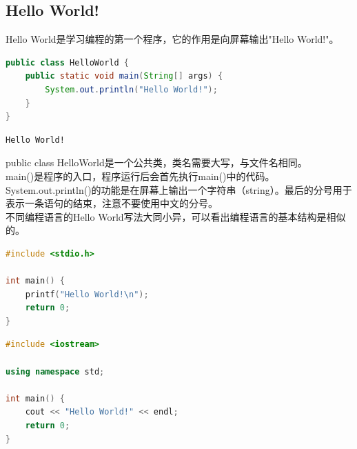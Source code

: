 \vspace{0.5cm}

\subsection{Hello World!}

Hello World是学习编程的第一个程序，它的作用是向屏幕输出"Hello World!"。\\


\begin{lstlisting}[language=Java]
public class HelloWorld {
	public static void main(String[] args) {
		System.out.println("Hello World!");
	}
}
\end{lstlisting}

\begin{tcolorbox}
	\begin{verbatim}
Hello World!
	\end{verbatim}
\end{tcolorbox}

public class HelloWorld是一个公共类，类名需要大写，与文件名相同。\\

main()是程序的入口，程序运行后会首先执行main()中的代码。System.out.println()的功能是在屏幕上输出一个字符串（string）。最后的分号用于表示一条语句的结束，注意不要使用中文的分号。\\

不同编程语言的Hello World写法大同小异，可以看出编程语言的基本结构是相似的。\\


\begin{lstlisting}[language=C]
#include <stdio.h>

int main() {
	printf("Hello World!\n");
	return 0;
}
\end{lstlisting}

\vspace{0.5cm}


\begin{lstlisting}[language=C++]
#include <iostream>

using namespace std;

int main() {
	cout << "Hello World!" << endl;
	return 0;
}
\end{lstlisting}

\vspace{0.5cm}

